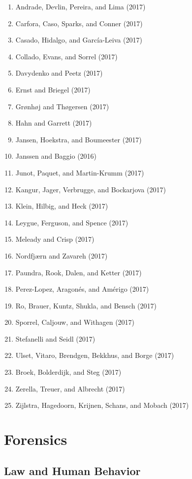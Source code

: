 \documentclass[english,man]{apa6}
\providecommand{\tightlist}{%
  \setlength{\itemsep}{0pt}\setlength{\parskip}{0pt}}
\theoremstyle{definition}
\theoremstyle{definition}
\theoremstyle{definition}
\theoremstyle{remark}
\begin{document}
\begin{enumerate}
\def\labelenumi{\arabic{enumi})}
\tightlist
\item
  Andrade, Devlin, Pereira, and Lima (2017)
\item
  Carfora, Caso, Sparks, and Conner (2017)
\item
  Casado, Hidalgo, and García-Leiva (2017)
\item
  Collado, Evans, and Sorrel (2017)
\item
  Davydenko and Peetz (2017)
\item
  Ernst and Briegel (2017)
\item
  Grønhøj and Thøgersen (2017)
\item
  Hahn and Garrett (2017)
\item
  Jansen, Hoekstra, and Boumeester (2017)
\item
  Janssen and Baggio (2016)
\item
  Junot, Paquet, and Martin-Krumm (2017)
\item
  Kangur, Jager, Verbrugge, and Bockarjova (2017)
\item
  Klein, Hilbig, and Heck (2017)
\item
  Leygue, Ferguson, and Spence (2017)
\item
  Meleady and Crisp (2017)
\item
  Nordfjærn and Zavareh (2017)
\item
  Paundra, Rook, Dalen, and Ketter (2017)
\item
  Perez-Lopez, Aragonés, and Amérigo (2017)
\item
  Ro, Brauer, Kuntz, Shukla, and Bensch (2017)
\item
  Sporrel, Caljouw, and Withagen (2017)
\item
  Stefanelli and Seidl (2017)
\item
  Ulset, Vitaro, Brendgen, Bekkhus, and Borge (2017)
\item
  Broek, Bolderdijk, and Steg (2017)
\item
  Zerella, Treuer, and Albrecht (2017)
\item
  Zijlstra, Hagedoorn, Krijnen, Schans, and Mobach (2017)
\end{enumerate}

\section{Forensics}\label{forensics}

\subsection{Law and Human Behavior}\label{law-and-human-behavior}
\end{document}
